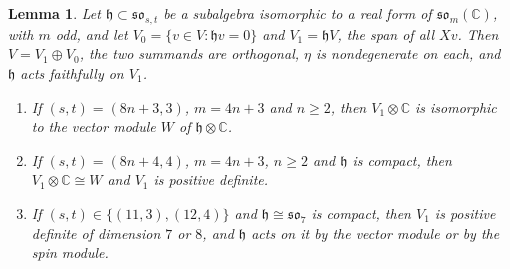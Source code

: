 \documentclass[11pt]{amsart}
\newtheorem{lemma}[theorem]{Lemma}
\theoremstyle{remark}
\newcommand{\so}{\mathfrak{so}}
\newcommand{\h}{\mathfrak{h}}
\newcommand{\C}{\mathbb{C}}
\begin{document}
\begin{lemma}\label{lem:embed}
Let $\h\subset\so_{s,t}$ be a subalgebra isomorphic to a real form of $\so_m(\C)$, with $m$ odd, and let $V_0=\{v\in V:\h v=0\}$ and $V_1=\h V$, the span of all $Xv$. Then $V=V_1\oplus V_0$, the two summands are orthogonal, $\eta$ is nondegenerate on each, and $\h$ acts faithfully on $V_1$.
\begin{enumerate}
\item[(a)] If $(s,t)=(8n+3,3)$, $m=4n+3$ and $n\ge2$, then $V_1\otimes\C$ is isomorphic to the vector module $W$ of $\h\otimes\C$.
\item[(b)] If $(s,t)=(8n+4,4)$, $m=4n+3$, $n\ge2$ and $\h$ is compact, then $V_1\otimes\C\cong W$ and $V_1$ is positive definite.
\item[(c)] If $(s,t)\in\{(11,3),(12,4)\}$ and $\h\cong\so_7$ is compact, then $V_1$ is positive definite of dimension $7$ or $8$, and $\h$ acts on it by the vector module or by the spin module.
\end{enumerate}
\end{lemma}
\end{document}
